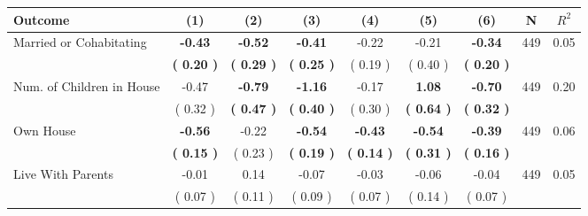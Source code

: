 \begin{tabular}{lcccccccc}
\toprule
 \textbf{Outcome} & \textbf{(1)} & \textbf{(2)} & \textbf{(3)} & \textbf{(4)} & \textbf{(5)} & \textbf{(6)} & \textbf{N} & \textbf{$ R^2$} \\
\midrule
Married or Cohabitating & \textbf{    -0.43} & \textbf{    -0.52} & \textbf{    -0.41} &     -0.22 &     -0.21 & \textbf{    -0.34} & 449 &       0.05 \\ 
 & \textbf{(     0.20 )} & \textbf{(     0.29 )} & \textbf{(     0.25 )} & (     0.19 ) & (     0.40 ) & \textbf{(     0.20 )} & \\
Num. of Children in House &     -0.47 & \textbf{    -0.79} & \textbf{    -1.16} &     -0.17 & \textbf{     1.08} & \textbf{    -0.70} & 449 &       0.20 \\ 
 & (     0.32 ) & \textbf{(     0.47 )} & \textbf{(     0.40 )} & (     0.30 ) & \textbf{(     0.64 )} & \textbf{(     0.32 )} & \\
Own House & \textbf{    -0.56} &     -0.22 & \textbf{    -0.54} & \textbf{    -0.43} & \textbf{    -0.54} & \textbf{    -0.39} & 449 &       0.06 \\ 
 & \textbf{(     0.15 )} & (     0.23 ) & \textbf{(     0.19 )} & \textbf{(     0.14 )} & \textbf{(     0.31 )} & \textbf{(     0.16 )} & \\
Live With Parents &     -0.01 &      0.14 &     -0.07 &     -0.03 &     -0.06 &     -0.04 & 449 &       0.05 \\ 
 & (     0.07 ) & (     0.11 ) & (     0.09 ) & (     0.07 ) & (     0.14 ) & (     0.07 ) & \\
\bottomrule
\end{tabular}
